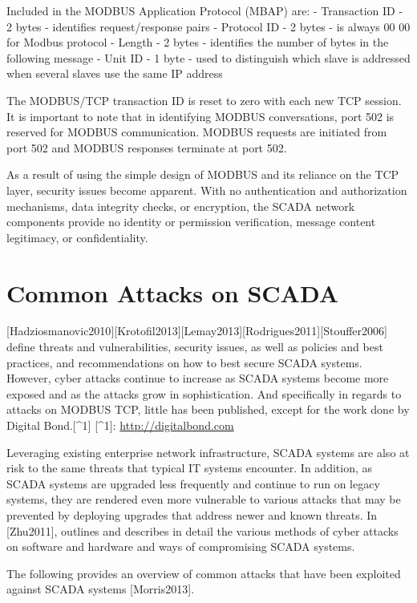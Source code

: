 \documentclass[12pt,]{article}
\begin{document}
Included in the MODBUS Application Protocol (MBAP) are: - Transaction ID
- 2 bytes - identifies request/response pairs - Protocol ID - 2 bytes -
is always 00 00 for Modbus protocol - Length - 2 bytes - identifies the
number of bytes in the following message - Unit ID - 1 byte - used to
distinguish which slave is addressed when several slaves use the same IP
address

The MODBUS/TCP transaction ID is reset to zero with each new TCP
session. It is important to note that in identifying MODBUS
conversations, port 502 is reserved for MODBUS communication. MODBUS
requests are initiated from port 502 and MODBUS responses terminate at
port 502.

As a result of using the simple design of MODBUS and its reliance on the
TCP layer, security issues become apparent. With no authentication and
authorization mechanisms, data integrity checks, or encryption, the
SCADA network components provide no identity or permission verification,
message content legitimacy, or confidentiality.

\pagebreak

\section{Common Attacks on SCADA}\label{common-attacks-on-scada}

{[}Hadziosmanovic2010{]}{[}Krotofil2013{]}{[}Lemay2013{]}{[}Rodrigues2011{]}{[}Stouffer2006{]}
define threats and vulnerabilities, security issues, as well as policies
and best practices, and recommendations on how to best secure SCADA
systems. However, cyber attacks continue to increase as SCADA systems
become more exposed and as the attacks grow in sophistication. And
specifically in regards to attacks on MODBUS TCP, little has been
published, except for the work done by Digital Bond.{[}\^{}1{]}
{[}\^{}1{]}: \url{http://digitalbond.com}

Leveraging existing enterprise network infrastructure, SCADA systems are
also at risk to the same threats that typical IT systems encounter. In
addition, as SCADA systems are upgraded less frequently and continue to
run on legacy systems, they are rendered even more vulnerable to various
attacks that may be prevented by deploying upgrades that address newer
and known threats. In {[}Zhu2011{]}, outlines and describes in detail
the various methods of cyber attacks on software and hardware and ways
of compromising SCADA systems.

The following provides an overview of common attacks that have been
exploited against SCADA systems {[}Morris2013{]}.
\end{document}
